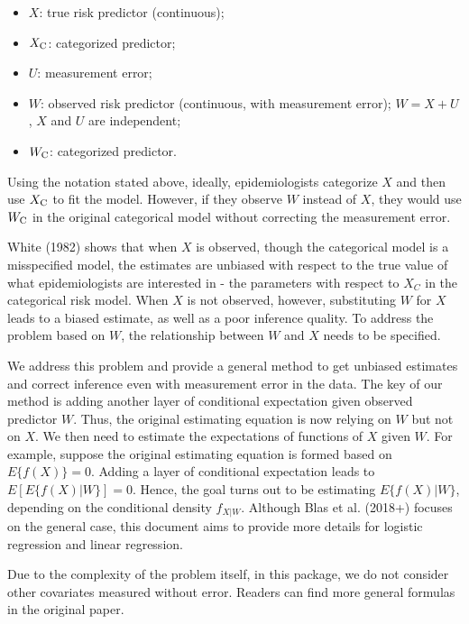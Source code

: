 \documentclass[15 pt,]{article}
\providecommand{\tightlist}{%
  \setlength{\itemsep}{0pt}\setlength{\parskip}{0pt}}
\begin{document}
\begin{itemize}
\tightlist
\item
  \(X\): true risk predictor (continuous);
\item
  \(X_{\rm C}\): categorized predictor;
\item
  \(U\): measurement error;
\item
  \(W\): observed risk predictor (continuous, with measurement error);
  \(W = X + U\), \(X\) and \(U\) are independent;
\item
  \(W_{\rm C}\): categorized predictor.
\end{itemize}

Using the notation stated above, ideally, epidemiologists categorize
\(X\) and then use \(X_{\rm C}\) to fit the model. However, if they
observe \(W\) instead of \(X\), they would use \(W_{\rm C}\) in the
original categorical model without correcting the measurement error.

White (1982) shows that when \(X\) is observed, though the categorical
model is a misspecified model, the estimates are unbiased with respect
to the true value of what epidemiologists are interested in - the
parameters with respect to \(X_C\) in the categorical risk model. When
\(X\) is not observed, however, substituting \(W\) for \(X\) leads to a
biased estimate, as well as a poor inference quality. To address the
problem based on \(W\), the relationship between \(W\) and \(X\) needs
to be specified.

We address this problem and provide a general method to get unbiased
estimates and correct inference even with measurement error in the data.
The key of our method is adding another layer of conditional expectation
given observed predictor \(W\). Thus, the original estimating equation
is now relying on \(W\) but not on \(X\). We then need to estimate the
expectations of functions of \(X\) given \(W\). For example, suppose the
original estimating equation is formed based on \(E\{f(X)\} = 0\).
Adding a layer of conditional expectation leads to \(E[E\{f(X)|W\}]=0\).
Hence, the goal turns out to be estimating \(E\{f(X)|W\}\), depending on
the conditional density \(f_{X|W}\). Although Blas et al. (2018+)
focuses on the general case, this document aims to provide more details
for logistic regression and linear regression.

Due to the complexity of the problem itself, in this package, we do not
consider other covariates measured without error. Readers can find more
general formulas in the original paper.
\end{document}
